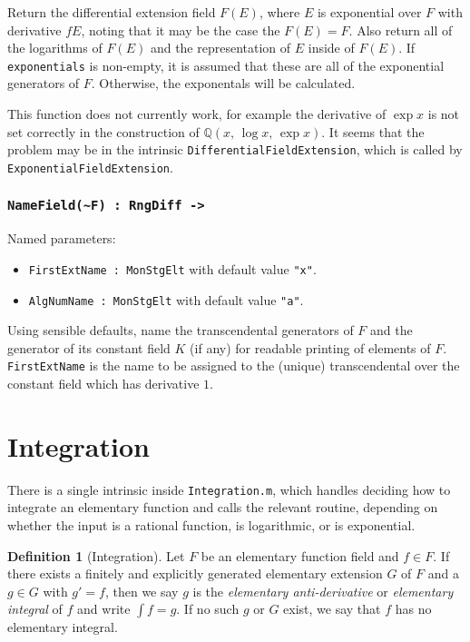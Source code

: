 \documentclass{article}
\theoremstyle{plain}
\theoremstyle{definition}
\newtheorem{definition}{Definition}
\newcommand{\Q}{\mathbb{Q}}
\begin{document}
\noindent Return the differential extension field $F(E)$, where $E$ is
exponential over $F$ with derivative $fE$, noting that it may be the case the
$F(E) = F$. Also return all of the logarithms of $F(E)$ and the representation
of $E$ inside of $F(E)$. If \lstinline{exponentials} is non-empty, it is assumed
that these are all of the exponential generators of $F$. Otherwise, the
exponentals will be calculated. \medbreak

This function does not currently work, for example the derivative of $\exp x$ is
not set correctly in the construction of $\Q(x,\, \log x,\, \exp x)$. It seems
that the problem may be in the intrinsic \lstinline{DifferentialFieldExtension},
which is called by \lstinline{ExponentialFieldExtension}.



\subsubsection*{\lstinline{NameField(~F) : RngDiff ->}}

Named parameters:
\begin{itemize}
    \item[] \lstinline{FirstExtName : MonStgElt} with default value
        \lstinline{"x"}.
    \item[] \lstinline{AlgNumName : MonStgElt} with default value
        \lstinline{"a"}.
\end{itemize}

\noindent Using sensible defaults, name the transcendental generators of $F$ and
the generator of its constant field $K$ (if any) for readable printing of
elements of $F$. \lstinline{FirstExtName} is the name to be assigned to the
(unique) transcendental over the constant field which has derivative $1$.

\section{Integration}
There is a single intrinsic inside \lstinline{Integration.m}, which handles
deciding how to integrate an elementary function and calls the relevant routine,
depending on whether the input is a rational function, is logarithmic, or is
exponential.

\begin{definition}[Integration] \label{elt_int}
    Let $F$ be an elementary function field and $f \in F$. If there exists a
    finitely and explicitly generated elementary extension $G$ of $F$ and a $g
    \in G$ with $g' = f$, then we say $g$ is the \emph{elementary
    anti-derivative} or \emph{elementary integral} of $f$ and write $\int f =
    g$. If no such $g$ or $G$ exist, we say that $f$ has no elementary integral.
\end{definition}
\end{document}
